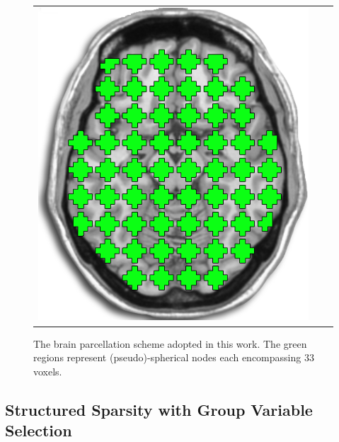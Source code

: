 \begin{figure}[t!]
\begin{tabular}{ccc}
		\includegraphics[height=\imheight]{roi_slice_axi.png}	\vspace{-8pt}\\
	\end{tabular}
	\caption{
	The brain parcellation scheme adopted in this work.
	The green regions represent (pseudo)-spherical nodes each encompassing $33$ voxels.
	}
	\vspace{-5pt}
	\label{fig:roi,grid,slice}
\end{figure}

\vspace{-4pt}\subsection{Structured Sparsity with Group Variable Selection}\vspace{-2pt}
\renewcommand{\HSPACE}{\hspace{-3pt}}
\newcommand{\xx}{\xmath{\grave{x}}}
\newcommand{\yy}{\xmath{\grave{y}}}
\newcommand{\zz}{\xmath{\grave{z}}}

